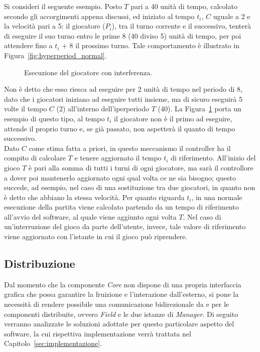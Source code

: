 Si consideri il seguente esempio. Posto $T$ pari a 40 unità di tempo, calcolato secondo gli accorgimenti appena discussi, ed iniziato al tempo $t_i$, $C$ uguale a 2 e la velocità pari a 5: il giocatore ($P_i$), tra il turno corrente e il successivo, tenterà di eseguire il suo turno entro le prime 8 (40 diviso 5) unità di tempo, per poi attendere fino a $t_i$ + 8 il prossimo turno. Tale comportamento è illustrato in Figura~\ref{fig:hyperperiod_normal}.\\

\begin{figure}[htb!]
	\centering
	\exampleTwo
	\caption{Esecuzione del giocatore con interferenza.}
	\label{fig:hyperperiod_interference}
\end{figure}

Non è detto che esso riesca ad eseguire per 2 unità di tempo nel periodo di 8, dato che i giocatori iniziano ad eseguire tutti insieme, ma di sicuro eseguirà 5 volte il tempo $C$ (2) all'interno dell'iperperiodo $T$ (40). La Figura~\ref{fig:hyperperiod_interference} porta un esempio di questo tipo, al tempo $t_i$ il giocatore non è il primo ad eseguire, attende il proprio turno e, se già passato, non aspetterà il quanto di tempo successivo.\\

Dato $C$ come stima fatta a priori, in questo meccanismo il controller ha il compito di calcolare $T$ e tenere aggiornato il tempo $t_i$ di riferimento. All'inizio del gioco $T$ è pari alla somma di tutti i turni di ogni giocatore, ma sarà il controllore a dover poi mantenerlo aggiornato ogni qual volta ce ne sia bisogno; questo succede, ad esempio, nel caso di una sostituzione tra due giocatori, in quanto non è detto che abbiano la stessa velocità. Per quanto riguarda $t_i$, in una normale esecuzione della partita viene calcolato partendo da un tempo di riferimento all'avvio del software, al quale viene aggiunto ogni volta $T$. Nel caso di un'interruzione del gioco da parte dell'utente, invece, tale valore di riferimento viene aggiornato con l'istante in cui il gioco può riprendere.\\

\subsection{Distribuzione}
\label{sec:analisi_distribuzione}

Dal momento che la componente \textit{Core} non dispone di una propria interfaccia grafica che possa garantire la fruizione e l'interazione dall'esterno, si pone la necessità di rendere possibile una comunicazione bidirezionale da e per le componenti distribuite, ovvero \textit{Field} e le due istanze di \textit{Manager}. Di seguito verranno analizzate le soluzioni adottate per questo particolare aspetto del software, la cui rispettiva implementazione verrà trattata nel Capitolo~\ref{sec:implementazione}.

